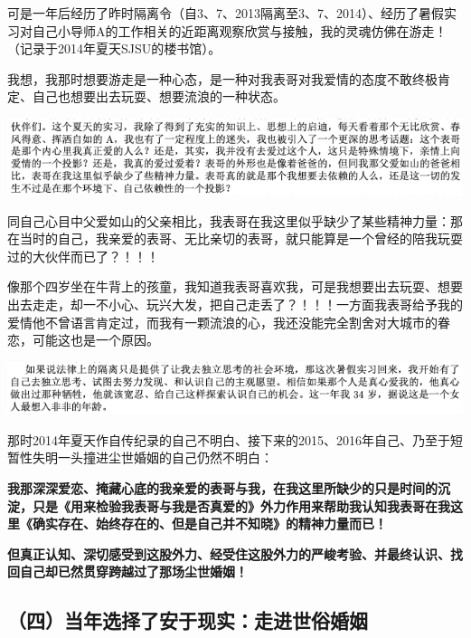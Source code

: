 \documentclass[9pt, b5paper]{article}
\begin{document}
可是一年后经历了昨时隔离令（自3、7、2013隔离至3、7、2014）、经历了暑假实习对自己小导师A的工作相关的近距离观察欣赏与接触，我的灵魂仿佛在游走！（记录于2014年夏天SJSU的楼书馆）。

我想，我那时想要游走是一种心态，是一种对我表哥对我爱情的态度不敢终极肯定、自己也想要出去玩耍、想要流浪的一种状态。

\begin{center}
\includegraphics[width=.9\linewidth]{./pic/backups_plans_20210422_075555.png}
\end{center}

同自己心目中父爱如山的父亲相比，我表哥在我这里似乎缺少了某些精神力量：那在当时的自己，我亲爱的表哥、无比亲切的表哥，就只能算是一个曾经的陪我玩耍过的大伙伴而已了？！！！

像那个四岁坐在牛背上的孩童，我知道我表哥喜欢我，可是我想要出去玩耍、想要出去走走，却一不小心、玩兴大发，把自己走丢了？！！！一方面我表哥给予我的爱情他不曾语言肯定过，而我有一颗流浪的心，我还没能完全割舍对大城市的眷恋，可能这也是一个原因。

\begin{center}
\includegraphics[width=.9\linewidth]{./pic/backups_plans_20210422_075830.png}
\end{center}

那时2014年夏天作自传纪录的自己不明白、接下来的2015、2016年自己、乃至于短暂性失明一头撞进尘世婚姻的自己仍然不明白：

\textbf{我那深深爱恋、掩藏心底的我亲爱的表哥与我，在我这里所缺少的只是时间的沉淀，只是《用来检验我表哥与我是否真爱的》外力作用来帮助我认知我表哥在我这里《确实存在、始终存在的、但是自己并不知晓》的精神力量而已！}

\textbf{但真正认知、深切感受到这股外力、经受住这股外力的严峻考验、并最终认识、找回自己却已然贯穿跨越过了那场尘世婚姻！}

\subsection{（四）当年选择了安于现实：走进世俗婚姻}
\label{sec:orgd38771d}
\end{document}
